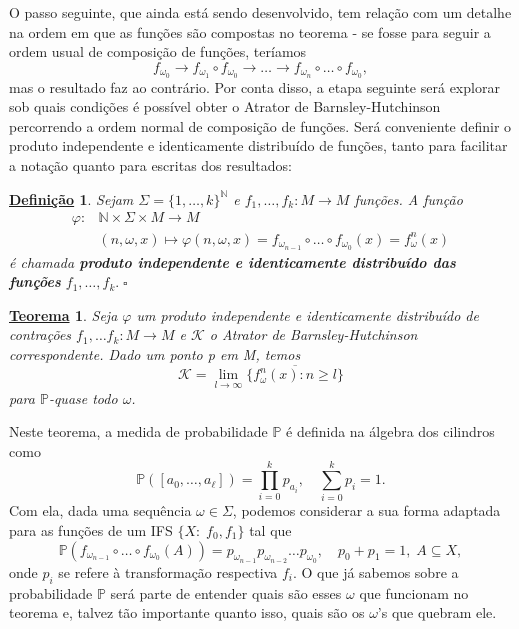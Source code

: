 \documentclass[12pt]{article}
\newtheorem*{def*}{\underline{Definição}}
\newtheorem*{theorem*}{\underline{Teorema}}
\theoremstyle{definition}
\begin{document}
O passo seguinte, que ainda está sendo desenvolvido, tem relação com um detalhe na ordem em que as funções são compostas no teorema - se fosse para seguir a ordem
usual de composição de funções, teríamos
\[
	f_{\omega_{0}}\rightarrow f_{\omega_{1}}\circ f_{\omega_{0}}\rightarrow \dotsc \rightarrow f_{\omega_{n}}\circ \dotsc \circ f_{\omega_{0}},
\]
mas o resultado faz ao contrário. Por conta disso, a etapa seguinte será explorar sob quais condições é possível obter o Atrator de Barnsley-Hutchinson percorrendo a ordem normal de composição de funções. Será conveniente definir o produto independente e identicamente distribuído de funções, tanto para facilitar a notação quanto para escritas dos resultados:
\begin{def*}
	Sejam \(\Sigma  = \{1, \dotsc , k\}^{\mathbb{N}}\) e \(f_1, \dotsc, f_{k}:M\rightarrow M\) funções. A função
	\begin{align*}
		\varphi : & \mathbb{N}\times \Sigma \times M\rightarrow M                                                                                 \\
		          & (n ,\omega , x)\longmapsto \varphi(n, \omega , x) = f_{\omega_{n-1}}\circ \dotsc \circ f_{\omega_{0}}(x) = f_{\omega }^{n}(x)
	\end{align*}
	é chamada \textbf{produto independente e identicamente distribuído das funções }\(f_1, \dotsc , f_{k}.\; \square\)
\end{def*}
\begin{theorem*}
	Seja \(\varphi \) um produto independente e identicamente distribuído de contrações \(f_{1},\dotsc f_{k}:M\rightarrow M\) e \(\mathcal{K}\) o Atrator de Barnsley-Hutchinson correspondente. Dado um
	ponto p em M, temos
	\[
		\mathcal{K}=\lim_{l\to \infty}\overline{\{f_{\omega }^{n}(x): n\geq l\}}
	\]
	para \(\mathbb{P}\)-quase todo \(\omega \).
\end{theorem*}
Neste teorema, a medida de probabilidade \(\mathbb{P}\) é definida na álgebra dos cilindros como
\[
	\mathbb{P}([a_{0}, \dotsc, a_{\ell}]) = \prod_{i=0}^{k}p_{a_i}, \quad \sum_{i=0}^{k}p_{i} = 1.
\]
Com ela, dada uma sequência \(\omega \in \Sigma\), podemos considerar a sua forma adaptada para as funções de um IFS \(\{X:\; f_{0}, f_{1}\}\) tal que
\[
	\mathbb{P}(f_{\omega_{n-1}}\circ \dotsc \circ f_{\omega_{0}}(A)) = p_{\omega_{n-1}}p_{\omega_{n-2}}\dotsc p_{\omega_{0}},\quad p_{0} + p_{1} = 1,\; A\subseteq X,
\]
onde \(p_{i}\) se refere à transformação respectiva \(f_{i}\).
O que já sabemos sobre a probabilidade \(\mathbb{P}\) será parte de entender quais são esses \(\omega \) que funcionam no teorema e, talvez tão importante quanto isso, quais são os \(\omega \)'s que quebram ele.
\end{document}
